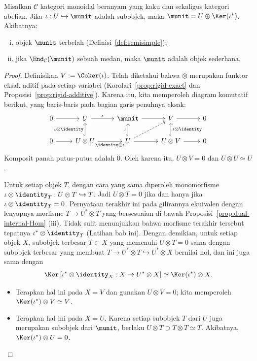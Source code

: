 \begin{proposition}\label{prop:rigid-unit-simple}
	Misalkan $\mathcal{C}$ kategori monoidal beranyam yang kaku dan sekaligus
kategori abelian. Jika $\iota:U\hookrightarrow\munit$ adalah subobjek, maka
$\munit=U\oplus\Ker(\iota^*)$. Akibatnya:
	\begin{enumerate}[(i)]
		\item objek $\munit$ terbelah (Definisi~\ref{def:semisimple});
		\item jika $\End_{\mathcal{C}}(\munit)$ sebuah medan, maka $\munit$
		adalah objek sederhana.
	\end{enumerate}
\end{proposition}
\begin{proof}
	Definisikan $V:=\Coker(\iota)$. Telah diketahui bahwa $\otimes$ merupakan
funktor eksak aditif pada setiap variabel (Korolari~\ref{prop:rigid-exact}
dan Proposisi~\ref{prop:rigid-additive}). Karena itu, kita memperoleh diagram
komutatif berikut, yang baris-baris pada bagian garis penuhnya eksak:
	\[\begin{tikzcd}
		0 \arrow[r] & U \arrow[r, "\iota"] & \munit \arrow[r] & V \arrow[r] & 0 \\
		0 \arrow[r] & U \otimes U \arrow[hookrightarrow, u, "{\iota \otimes \identity}"] \arrow[r, "{\identity \otimes \iota}"'] & U \arrow[hookrightarrow, u, "\iota"] \arrow[r] \arrow[dashed, ru] & U \otimes V \arrow[hookrightarrow, u, "{\iota \otimes \identity}"'] \arrow[r] & 0
	\end{tikzcd}\]
	Komposit panah putus-putus adalah $0$. Oleh karena itu,
$U\otimes V=0$ dan $U\otimes U\simeq U$.

	Untuk setiap objek $T$, dengan cara yang sama diperoleh monomorfisme
$\iota\otimes\identity_T:U\otimes T\hookrightarrow T$. Jadi
$U\otimes T=0$ jika dan hanya jika
$\iota\otimes\identity_T=0$. Pernyataan terakhir ini pada gilirannya
	ekuivalen dengan lenyapnya morfisme $T\to U^*\otimes T$ yang bersesuaian
di bawah Proposisi~\ref{prop:dual-internal-Hom} (iii). Tidak sulit
menunjukkan bahwa morfisme terakhir tersebut tepatnya
$\iota^*\otimes\identity_T$ (Latihan bab ini). Dengan demikian, untuk
setiap objek $X$, subobjek terbesar $T\subset X$ yang memenuhi
$U\otimes T=0$ sama dengan subobjek terbesar yang membuat
$T\to U^*\otimes T\hookrightarrow U^*\otimes X$ bernilai nol, dan ini
juga sama dengan
	\[ \Ker\left[ \iota^* \otimes \identity_X: X \to U^* \otimes X \right] \simeq \Ker(\iota^*) \otimes X. \]
	\begin{itemize}
		\item Terapkan hal ini pada $X=V$ dan gunakan $U\otimes V=0$;
		kita memperoleh $\Ker(\iota^*)\otimes V\simeq V$.
		\item Terapkan hal ini pada $X=U$. Karena setiap subobjek $T$ dari
		$U$ juga merupakan subobjek dari $\munit$, berlaku
		$U\otimes T\supset T\otimes T\simeq T$. Akibatnya,
		$\Ker(\iota^*)\otimes U=0$.
	\end{itemize}


\end{proof}
